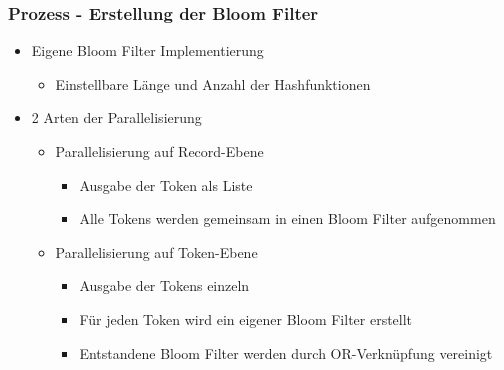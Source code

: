 \documentclass{beamer}
\begin{document}
    \begin{frame}
    		\frametitle{Prozess - Erstellung der Bloom Filter}
    		\begin{itemize}
    			\item Eigene Bloom Filter Implementierung
    			\begin{itemize}
    				\item Einstellbare Länge und Anzahl der Hashfunktionen
    			\end{itemize}
    			\item 2 Arten der Parallelisierung
    			\begin{itemize}
    				\item Parallelisierung auf Record-Ebene
    				\begin{itemize}
    					\item Ausgabe der Token als Liste
    					\item Alle Tokens werden gemeinsam in einen Bloom Filter aufgenommen
    				\end{itemize}
    				\item Parallelisierung auf Token-Ebene
    				\begin{itemize}
    					\item Ausgabe der Tokens einzeln
    					\item Für jeden Token wird ein eigener Bloom Filter erstellt
    					\item Entstandene Bloom Filter werden durch OR-Verknüpfung vereinigt
    				\end{itemize}
    			\end{itemize}
    		\end{itemize}
    \end{frame}
    
\end{document}
